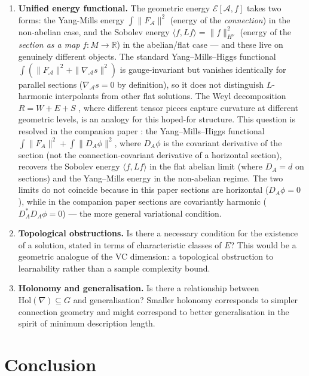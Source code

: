 \documentclass[11pt, a4paper]{article}
\theoremstyle{plain}
\theoremstyle{definition}
\newcommand{\R}{\mathbb{R}}
\newcommand{\Hol}{\mathrm{Hol}}
\newcommand{\Sig}{\mathcal{A}}
\begin{document}
\begin{enumerate}[label=\textbf{Q\arabic*.}, leftmargin=*, itemsep=6pt]
\item \textbf{Unified energy functional.}
The geometric energy $\mathcal{E}[\Sig, f]$ takes two forms: the Yang-Mills
energy $\int\|F_\Sig\|^2$ (energy of the \emph{connection}) in the non-abelian
case, and the Sobolev energy $\langle f, Lf\rangle = \|f\|^2_{H^\nu}$ (energy of the
\emph{section as a map} $f: M \to \R$) in the abelian/flat case --- and these
live on genuinely different objects. The standard Yang--Mills--Higgs functional
$\int(\|F_\Sig\|^2 + \|\nabla_\Sig s\|^2)$ is gauge-invariant but
vanishes identically for parallel sections ($\nabla_\Sig s = 0$ by
definition), so it does not distinguish $L$-harmonic interpolants from other flat
solutions. The Weyl decomposition $R = W + E + S$ \cite{besse1987}, where
different tensor pieces capture curvature at different geometric levels, is an
analogy for this hoped-for structure. This question is resolved in the companion
paper \cite{Vasii2026Paper2}: the Yang--Mills--Higgs functional
$\int\|F_A\|^2 + \int\|D_A\phi\|^2$, where $D_A\phi$ is the covariant
derivative of the section (not the connection-covariant derivative of a horizontal
section), recovers the Sobolev energy $\langle f,Lf\rangle$ in the flat abelian
limit (where $D_A = d$ on sections) and the Yang--Mills energy in the non-abelian
regime. The two limits do not coincide because in this paper sections are
horizontal ($D_A\phi = 0$), while in the companion paper sections are
covariantly harmonic ($D_A^*D_A\phi = 0$) --- the more general variational
condition.

\item \textbf{Topological obstructions.}
Is there a necessary condition for the existence of a solution, stated in terms
of characteristic classes of $E$? This would be a geometric analogue of the VC
dimension: a topological obstruction to learnability rather than a sample
complexity bound.

\item \textbf{Holonomy and generalisation.}
Is there a relationship between $\Hol(\nabla) \subseteq G$ and generalisation?
Smaller holonomy corresponds to simpler connection geometry and might correspond
to better generalisation in the spirit of minimum description length.

\end{enumerate}

\section{Conclusion}
\end{document}
